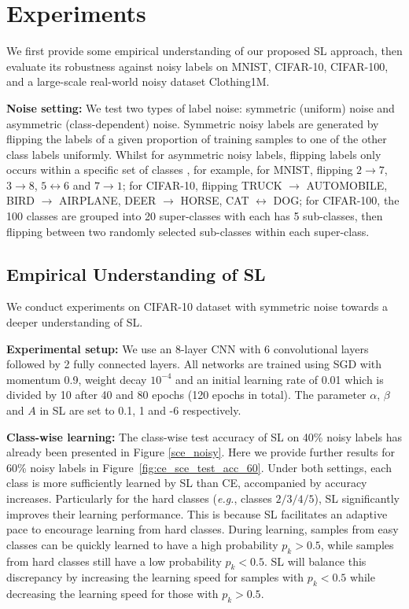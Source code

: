 \documentclass[10pt,twocolumn,letterpaper]{article}
\begin{document}
\section{Experiments}\label{sec:experiments}
We first provide some empirical understanding of our proposed SL approach, then evaluate its robustness against noisy labels on MNIST, CIFAR-10, CIFAR-100, and a large-scale real-world noisy dataset Clothing1M.

\noindent\textbf{Noise setting:} 
We test two types of label noise: symmetric (uniform) noise and asymmetric (class-dependent) noise. Symmetric noisy labels are generated by flipping the labels of a given proportion of training samples to one of the other class labels uniformly. Whilst for asymmetric noisy labels, flipping labels only occurs within a specific set of classes \cite{patrini2017making, zhang2018generalized}, for example, for MNIST, flipping $2 \to 7$, $3 \to 8$, $5 \leftrightarrow 6$ and $7 \to 1$; for CIFAR-10, flipping TRUCK $\to$ AUTOMOBILE, BIRD $\to$ AIRPLANE, DEER $\to$ HORSE, CAT $\leftrightarrow$ DOG; for CIFAR-100, the 100 classes are grouped into 20 super-classes with each has 5 sub-classes, then flipping between two randomly selected sub-classes within each super-class.

\subsection{Empirical Understanding of SL}\label{understanding_sce}
We conduct experiments on CIFAR-10 dataset with symmetric noise towards a deeper understanding of SL. 

\noindent\textbf{Experimental setup:} We use an 8-layer CNN with 6 convolutional layers followed by 2 fully connected layers. 
All networks are trained using SGD with momentum 0.9, weight decay $10^{-4}$ and an initial learning rate of 0.01 which is divided by 10 after 40 and 80 epochs (120 epochs in total). The parameter $\alpha$, $\beta$ and $A$ in SL are set to 0.1, 1 and -6 respectively.

\noindent\textbf{Class-wise learning:} The class-wise test accuracy of SL on 40\% noisy labels has already been presented in Figure \ref{sce_noisy}. Here we provide further results for 60\% noisy labels in Figure~\ref{fig:ce_sce_test_acc_60}. Under both settings, each class is more sufficiently learned by SL than CE, accompanied by accuracy increases. Particularly for the hard classes (\textit{e.g.}, classes $2/3/4/5$), SL significantly improves their learning performance.
This is because SL facilitates an adaptive pace to encourage learning from hard classes. During learning, samples from easy classes can be quickly learned to have a high probability $p_k > 0.5$, while samples from hard classes still have a low probability $p_k < 0.5$. SL will balance this discrepancy by increasing the learning speed for samples with $p_k < 0.5$ while decreasing the learning speed for those with $p_k > 0.5$. 
\end{document}
